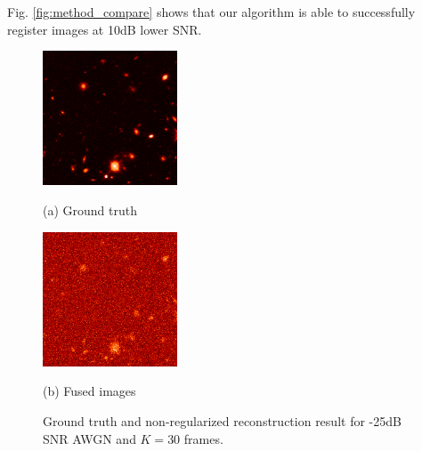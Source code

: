 \documentclass{article}
\begin{document}
Fig. \ref{fig:method_compare} shows that our algorithm is able to successfully register images at 10dB lower SNR.


\begin{figure}[htb]
\begin{minipage}[b]{.48\linewidth}
  \centering
  \centerline{\includegraphics[width=4.0cm]{images/recon_clean.png}}
  \centerline{(a) Ground truth}\medskip
\end{minipage}
\hfill
\begin{minipage}[b]{0.48\linewidth}
  \centering
  \centerline{\includegraphics[width=4.0cm]{images/recon.png}}
  \centerline{(b) Fused images}\medskip
\end{minipage}
  \caption{Ground truth and non-regularized reconstruction result for -25dB SNR AWGN and $K=30$ frames.}
\label{fig:recon}
\end{figure}



\end{document}
